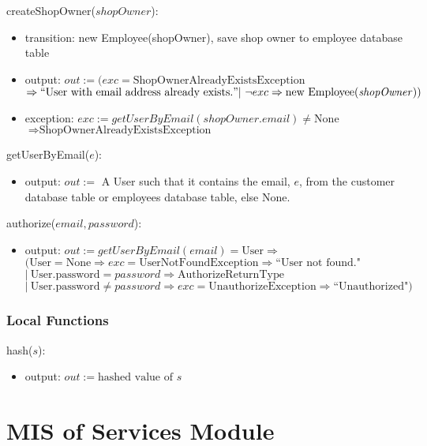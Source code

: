 \documentclass[12pt, titlepage]{article}
\begin{document}
\noindent createShopOwner($shopOwner$):
\begin{itemize}
	\item transition: new Employee(shopOwner), save shop owner to employee database table
	\item output: $out := (exc = \text{ShopOwnerAlreadyExistsException}$ \\ $\Rightarrow ``\text{User with
			      email address already exists.}" |\ \neg exc \Rightarrow \text{new Employee(\emph{shopOwner})})$
	\item exception: $exc := getUserByEmail(shopOwner.email) \neq \text{None}$ \\ $\Rightarrow
		      \text{ShopOwnerAlreadyExistsException}$
\end{itemize}

\noindent getUserByEmail($e$):
\begin{itemize}
	\item output: $out :=$ A User such that it contains the email, $e$, from the customer database table or
	      employees database table, else None.
\end{itemize}

\noindent authorize($email, password$):
\begin{itemize}
	\item output: $out := getUserByEmail(email) = \text{User} \Rightarrow $ \\ $(\text{User} = \text{None}
		      \Rightarrow exc = \text{UserNotFoundException} \Rightarrow \text{``User not found."}$ \\ $|\
		      \text{User.password} = password \Rightarrow \text{AuthorizeReturnType}$ \\ $|\ \text{User.password}
		      \neq password \Rightarrow exc = \text{UnauthorizeException} \Rightarrow \text{``Unauthorized"})$
\end{itemize}

\subsubsection{Local Functions}

\noindent hash($s$):
\begin{itemize}
	\item output: $out := \text{hashed value of } s$
\end{itemize}

\newpage

\section{MIS of Services Module} \label{mServices}
\end{document}
